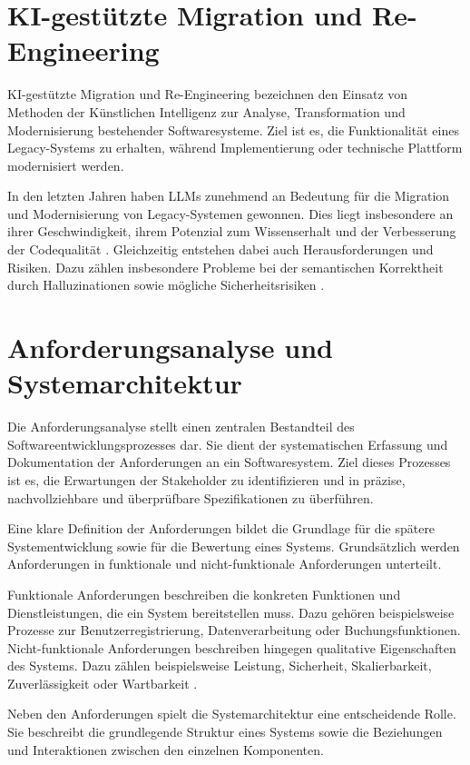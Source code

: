 \section{KI-gestützte Migration und Re-Engineering}

KI-gestützte Migration und Re-Engineering bezeichnen
den Einsatz von Methoden der Künstlichen Intelligenz
zur Analyse, Transformation und Modernisierung
bestehender Softwaresysteme. Ziel ist es, die Funktionalität eines Legacy-Systems zu erhalten, während Implementierung oder technische Plattform modernisiert werden.

In den letzten Jahren haben LLMs zunehmend an Bedeutung für die Migration und
Modernisierung von Legacy-Systemen gewonnen.
Dies liegt insbesondere an ihrer Geschwindigkeit,
ihrem Potenzial zum Wissenserhalt und der
Verbesserung der Codequalität \cite{agarwal2024legacy}.
Gleichzeitig entstehen dabei auch Herausforderungen
und Risiken. Dazu zählen insbesondere Probleme bei der semantischen
Korrektheit durch Halluzinationen sowie mögliche
Sicherheitsrisiken \cite{chen2021evaluatinglargelanguagemodels}.

\section{Anforderungsanalyse und Systemarchitektur}

Die Anforderungsanalyse stellt einen zentralen
Bestandteil des Softwareentwicklungsprozesses dar.
Sie dient der systematischen Erfassung und
Dokumentation der Anforderungen an ein
Softwaresystem. Ziel dieses Prozesses ist es, die Erwartungen der
Stakeholder zu identifizieren und in präzise,
nachvollziehbare und überprüfbare Spezifikationen zu
überführen.

Eine klare Definition der Anforderungen bildet die
Grundlage für die spätere Systementwicklung sowie für
die Bewertung eines Systems. Grundsätzlich werden Anforderungen in funktionale und
nicht-funktionale Anforderungen unterteilt.

Funktionale Anforderungen beschreiben die konkreten
Funktionen und Dienstleistungen, die ein System
bereitstellen muss. Dazu gehören beispielsweise Prozesse zur
Benutzerregistrierung, Datenverarbeitung oder
Buchungsfunktionen. Nicht-funktionale Anforderungen beschreiben hingegen
qualitative Eigenschaften des Systems. Dazu zählen beispielsweise Leistung, Sicherheit,
Skalierbarkeit, Zuverlässigkeit oder Wartbarkeit
\cite{leucker2024anforderungen}.

Neben den Anforderungen spielt die Systemarchitektur
eine entscheidende Rolle. Sie beschreibt die grundlegende Struktur eines Systems
sowie die Beziehungen und Interaktionen zwischen den
einzelnen Komponenten.

